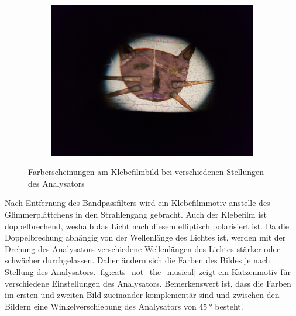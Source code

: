 \begin{figure}[tb]
\begin{subfigure}{.3\textwidth}
		\label{subfig:catb}
	\end{subfigure}
	$\quad$
	\begin{subfigure}{.3\textwidth}
		\centering
		\includegraphics[height=.8\linewidth]{./img/cat3.jpg}
		\label{subfig:catc}
	\end{subfigure}
	\caption[Doppelbrechung von polychromatischem Licht]{Farberscheinungen am Klebefilmbild bei verschiedenen Stellungen des Analysators}
	\label{fig:cats_not_the_musical}
\end{figure}
Nach Entfernung des Bandpassfilters wird ein Klebefilmmotiv anstelle des Glimmerplättchens in den Strahlengang gebracht.
Auch der Klebefilm ist doppelbrechend, weshalb das Licht nach diesem elliptisch polarisiert ist.
Da die Doppelbrechung abhängig von der Wellenlänge des Lichtes ist, werden mit der Drehung des Analysators verschiedene Wellenlängen des Lichtes stärker oder schwächer durchgelassen.
Daher ändern sich die Farben des Bildes je nach Stellung des Analysators.
\autoref{fig:cats_not_the_musical} zeigt ein Katzenmotiv für verschiedene Einstellungen des Analysators.
Bemerkenswert ist, dass die Farben im ersten und zweiten Bild zueinander komplementär sind und zwischen den Bildern eine Winkelverschiebung des Analysators von $\SI{45}{\degree}$ besteht.
